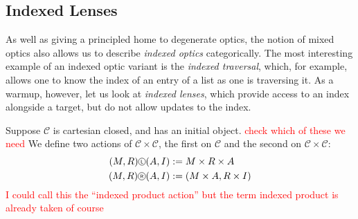 \documentclass[11pt,letterpaper]{article}
\theoremstyle{plain}
\theoremstyle{definition}
\newtheorem{definition}[theorem]{Definition}
\newcommand{\C}{\mathscr{C}}
\newcommand{\homC}{\underline{\C}}
\newcommand{\IdxLens}{\mathbf{IdxLens}}
\newcommand{\op}{\mathrm{op}}
\newcommand*\circled[1]{\tikz[baseline={([yshift=-0.65ex]current bounding box.center)}]{
   \node[shape=circle,draw,inner sep=1pt] (char) {#1};}}
\newcommand{\actL}{{\circled{\tiny$\mathsf{L}$}}}
\newcommand{\actR}{{\circled{\tiny$\mathsf{R}$}}}
\newcommand{\todo}[1]{\textcolor{red}{\small #1}}
\begin{document}
\subsection{Indexed Lenses}
As well as giving a principled home to degenerate optics, the notion of mixed optics also allows us to describe \emph{indexed optics} categorically. The most interesting example of an indexed optic variant is the \emph{indexed traversal}, which, for example, allows one to know the index of an entry of a list as one is traversing it. As a warmup, however, let us look at \emph{indexed lenses}, which provide access to an index alongside a target, but do not allow updates to the index.

Suppose $\C$ is cartesian closed, and has an initial object. \todo{check which of these we need} We define two actions of $\C \times \C$, the first on $\C$ and the second on $\C \times \C$:
\begin{align*}
(M, R) \actL (A, I) &:= M \times R \times A \\
(M, R) \actR (A, I) &:= (M \times A, R \times I)
\end{align*}
\todo{I could call this the ``indexed product action'' but the term indexed product is already taken of course}


\end{document}
